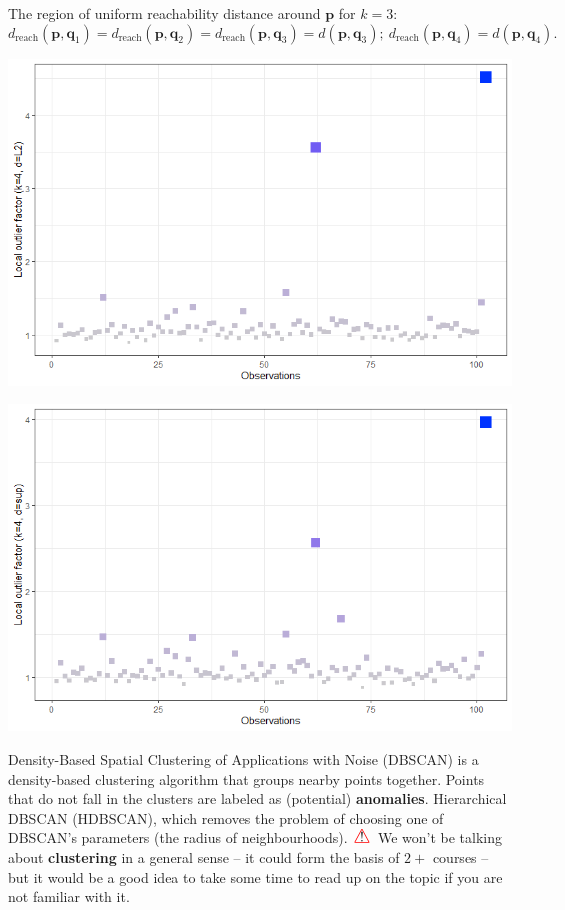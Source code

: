 \documentclass[20pt,landscape,footrule,headrule]{foils}
\newcommand{\newl}{\newline\newline}
\newcommand\Warning{%
 \makebox[1.4em][c]{%
 \makebox[0pt][c]{\raisebox{.1em}{!}}%
 \makebox[0pt][c]{\color{red}\Large$\bigtriangleup$}}}%
\def\fh{\foilhead}
\begin{document}
{{The region of uniform reachability distance around $\mathbf{p}$ for $k=3$: 
$$d_{\text{reach}}(\mathbf{p}, \mathbf{q}_1) 
= d_{\text{reach}}(\mathbf{p}, \mathbf{q}_2)
= d_{\text{reach}}(\mathbf{p}, \mathbf{q}_3)
= d(\mathbf{p}, \mathbf{q}_3);\   d_{\text{reach}}(\mathbf{p}, \mathbf{q}_4)
= d(\mathbf{p}, \mathbf{q}_4).$$
\newpage
\begin{center}
\includegraphics[width=\textwidth]{Images/AD_LOF_k=4_d=L2}
\end{center}
\newpage
\begin{center}
\includegraphics[width=\textwidth]{Images/AD_LOF_k=4_d=sup}
\end{center}

\fh{DBSCAN}
\noindent Density-Based Spatial Clustering of Applications with Noise (DBSCAN) is a density-based clustering algorithm that groups nearby points together. \newl Points that do not fall in the clusters are labeled as (potential) \textbf{anomalies}.
\newl Hierarchical DBSCAN (HDBSCAN), which  removes the problem of choosing one of DBSCAN's parameters (the radius of  neighbourhoods). \newl $\Warning$ We won't be talking about \textbf{clustering} in a general sense -- it could form the basis of $2+$ courses -- but it would be a good idea to take some time to read up on the topic if you are not familiar with it.

}}
\end{document}
